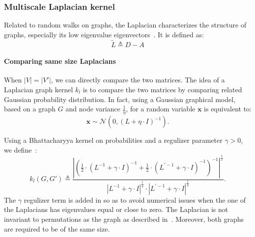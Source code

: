             \subsubsection{Multiscale Laplacian kernel}
                Related to random walks on graphs, the Laplacian characterizes the structure of graphs, especially its low eigenvalue eigenvectors~\parencite{kondor2016multiscale}.
                It is defined as:
                \begin{equation}
                    \label{eq::laplacian_graph}
                    \widetilde{L} \triangleq D - A
                \end{equation}

                \paragraph{Comparing same size Laplacians}
                    When $\vert V \vert = \vert V' \vert$, we can directly compare the two matrices.
                    The idea of a Laplacian graph kernel $k_{l}$ is to compare the two matrices by comparing related Gaussian probability distribution.
                    In fact, using a Gaussian graphical model, based on a graph $G$ and node variance $\frac{1}{\eta}$, for a random variable $\bm{x}$ is equivalent to:
                    \begin{equation}
                        \label{eq::guassian_gm}
                        \bm{x} \sim \mathscr{N}\left(0, \left(L + \eta \cdot I\right)^{-1}\right).
                    \end{equation}

                    Using a Bhattacharyya kernel on probabilities and a regulizer parameter $\gamma>0$, we define~\parencite{kondor2016multiscale}:
                    \begin{equation}
                        \label{eq::laplacian_kernel}
                        k_{l}(G, G') \triangleq \frac{\left\lvert \left(\frac{1}{2} \cdot \left(L^{-1}+\gamma\cdot I\right)^{-1} + \frac{1}{2} \cdot \left(L^{\prime -1}+\gamma\cdot I\right)^{-1} \right)^{-1} \right\rvert^{\frac{1}{2}}}{\left\lvert L^{-1} + \gamma \cdot I\right\rvert^{\frac{1}{4}}\cdot\left\lvert L^{\prime -1} + \gamma \cdot I\right\rvert^{\frac{1}{4}}}.
                    \end{equation}
                    The \(\gamma\) regulizer term is added in so as to avoid numerical issues when the one of the Laplacians has eigenvalues equal or close to zero.
                    The Laplacian is not invariant to permutations as the graph as described in~\textcite{kondor2016multiscale}.
                    Moreover, both graphs are required to be of the same size.\\


